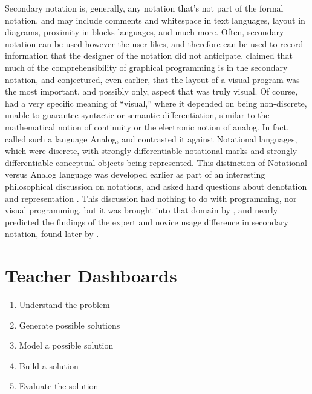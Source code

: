 Secondary notation is, generally, any notation that's not part of the formal notation, and may include comments and whitespace in text languages, layout in diagrams, proximity in blocks languages, and much more. Often, secondary notation can be used however the user likes, and therefore can be used to record information that the designer of the notation did not anticipate. \citet{petre-1995} claimed that much of the comprehensibility of graphical programming is in the secondary notation, and \citet{raymond-1991} conjectured, even earlier, that the layout of a visual program was the most important, and possibly only, aspect that was truly visual. Of course, \citeauthor{raymond-1991} had a very specific meaning of ``visual,'' where it depended on being non-discrete, unable to guarantee syntactic or semantic differentiation, similar to the mathematical notion of continuity or the electronic notion of analog. In fact, \citeauthor{raymond-1991} called such a language Analog, and contrasted it against Notational languages, which were discrete, with strongly differentiable notational marks and strongly differentiable conceptual objects being represented. This distinction of Notational versus Analog language was developed earlier as part of an interesting philosophical discussion on notations, and asked hard questions about denotation and representation \citep{goodman-1976}. This discussion had nothing to do with programming, nor visual programming, but it was brought into that domain by \citeauthor{raymond-1991}, and nearly predicted the findings of the expert and novice usage difference in secondary notation, found later by \citet{petre-2006}.





\section{Teacher Dashboards}
\label{sec:teacher-dashboards}


\begin{enumerate}
\item Understand the problem
\item Generate possible solutions
\item Model a possible solution
\item Build a solution
\item Evaluate the solution
\end{enumerate}


